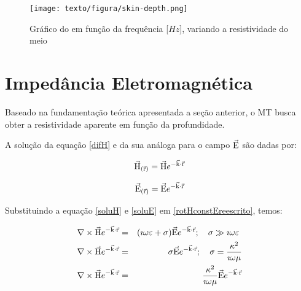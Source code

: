         \begin{figure}[H]
            \caption[Gráfico do ]{Gráfico do  em função da frequência [$Hz$], variando a resistividade do meio}
            \begin{center}
                \texttt{[image: texto/figura/skin-depth.png]}
            \end{center}
            \label{fig-skin-depth}
        \end{figure}
        
    \section{Impedância Eletromagnética}
        
        Baseado na fundamentação teórica apresentada a seção anterior, o MT busca obter a resistividade aparente em função da profundidade. 
        
        A solução da equação \ref{difH} e da sua análoga para o campo $\vec{\textrm{E}}$ são dadas por:
        
        \begin{equation}
            \label{soluH}
            \vec{\textrm{H}}_{(\vec{\textrm{r}})} = \vec{\textrm{H}} e^{-\vec{\textrm{k}} \cdot \vec{\textrm{r}}}
        \end{equation}

        \begin{equation}
            \label{soluE}
            \vec{\textrm{E}}_{(\vec{\textrm{r}})} = \vec{\textrm{E}} e^{-\vec{\textrm{k}} \cdot \vec{\textrm{r}}}
        \end{equation}

        
        Substituindo a equação \ref{soluH} e \ref{soluE} em \ref{rotHconstEreescrito}, temos:
        
        {\setlength\arraycolsep{2pt}
        \begin{eqnarray}
            \label{HEpossolu}
            \nabla \times \vec{\textrm{H}}e^{-\vec{\textrm{k}} \cdot \vec{\textrm{r}}} & = & (\imath \omega \varepsilon + \sigma) \vec{\textrm{E}}e^{-\vec{\textrm{k}} \cdot \vec{\textrm{r}}}; \quad \sigma \gg \imath \omega \varepsilon \ \nonumber \\
            \nabla \times \vec{\textrm{H}}e^{-\vec{\textrm{k}} \cdot \vec{\textrm{r}}} & = & \sigma \vec{\textrm{E}}e^{-\vec{\textrm{k}} \cdot \vec{\textrm{r}}}; \quad \sigma = \dfrac{\kappa^2}{\imath \omega \mu} \nonumber \\
            \nabla \times \vec{\textrm{H}}e^{-\vec{\textrm{k}} \cdot \vec{\textrm{r}}} & = &\dfrac{\kappa^2}{\imath \omega \mu} \vec{\textrm{E}}e^{-\vec{\textrm{k}} \cdot \vec{\textrm{r}}}
        \end{eqnarray}} 
        
